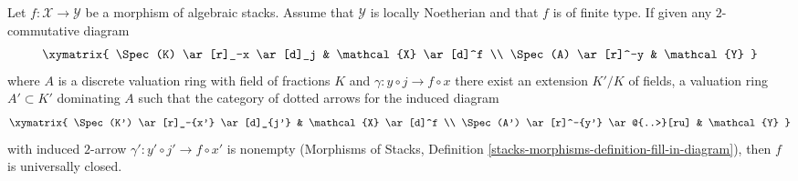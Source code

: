 \begin{lemma}
\label{lemma-valuative-criterion-universally-closed}
Let $f : \mathcal{X} \to \mathcal{Y}$ be a morphism of algebraic stacks.
Assume that $\mathcal{Y}$ is locally Noetherian and that $f$ is of finite type.
If given any $2$-commutative diagram
$$
\xymatrix{
\Spec(K) \ar[r]_-x \ar[d]_j & \mathcal{X} \ar[d]^f \\
\Spec(A) \ar[r]^-y & \mathcal{Y}
}
$$
where $A$ is a discrete valuation ring with field of fractions $K$
and $\gamma : y \circ j \to f \circ x$ there exist an extension $K'/K$
of fields, a valuation ring $A' \subset K'$ dominating $A$ such that
the category of dotted arrows for the induced diagram
$$
\xymatrix{
\Spec(K') \ar[r]_-{x'} \ar[d]_{j'} & \mathcal{X} \ar[d]^f \\
\Spec(A') \ar[r]^-{y'} \ar@{..>}[ru] & \mathcal{Y}
}
$$
with induced $2$-arrow $\gamma' : y' \circ j' \to f \circ x'$
is nonempty (Morphisms of Stacks, Definition
\ref{stacks-morphisms-definition-fill-in-diagram}), then $f$ is
universally closed.
\end{lemma}

